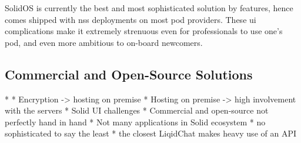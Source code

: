 SolidOS is currently the best and most sophisticated solution by features, hence comes shipped with \gls{nss} deployments on most pod providers. These \gls{ui} complications make it extremely strenuous even for professionals to use one's pod, and even more ambitious to on-board newcomers.

\subsection{Commercial and Open-Source Solutions}



* 
* Encryption -> hosting on premise
* Hosting on premise -> high involvement with the servers
* Solid UI challenges
* Commercial and open-source not perfectly hand in hand
* Not many applications in Solid ecosystem
    * no sophisticated to say the least
    * the closest LiqidChat makes heavy use of an API
